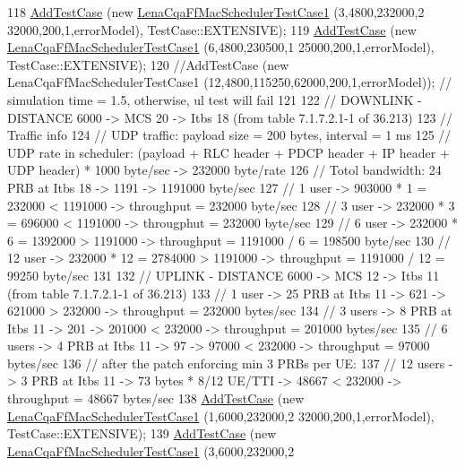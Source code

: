 \begin{DoxyCode}
118   \hyperlink{classns3_1_1TestCase_a3718088e3eefd5d6454569d2e0ddd835}{AddTestCase} (\textcolor{keyword}{new} \hyperlink{classLenaCqaFfMacSchedulerTestCase1}{LenaCqaFfMacSchedulerTestCase1} (3,4800,232000,2
      32000,200,1,errorModel), TestCase::EXTENSIVE);
119   \hyperlink{classns3_1_1TestCase_a3718088e3eefd5d6454569d2e0ddd835}{AddTestCase} (\textcolor{keyword}{new} \hyperlink{classLenaCqaFfMacSchedulerTestCase1}{LenaCqaFfMacSchedulerTestCase1} (6,4800,230500,1
      25000,200,1,errorModel), TestCase::EXTENSIVE);
120   \textcolor{comment}{//AddTestCase (new LenaCqaFfMacSchedulerTestCase1 (12,4800,115250,62000,200,1,errorModel)); // simulation
       time = 1.5, otherwise, ul test will fail}
121 
122   \textcolor{comment}{// DOWNLINK - DISTANCE 6000 -> MCS 20 -> Itbs 18 (from table 7.1.7.2.1-1 of 36.213)}
123   \textcolor{comment}{// Traffic info}
124   \textcolor{comment}{//   UDP traffic: payload size = 200 bytes, interval = 1 ms}
125   \textcolor{comment}{//   UDP rate in scheduler: (payload + RLC header + PDCP header + IP header + UDP header) * 1000 byte/sec
       -> 232000 byte/rate }
126   \textcolor{comment}{// Totol bandwidth: 24 PRB at Itbs 18 -> 1191 -> 1191000 byte/sec}
127   \textcolor{comment}{// 1 user -> 903000 * 1 = 232000 < 1191000 -> throughput = 232000 byte/sec}
128   \textcolor{comment}{// 3 user -> 232000 * 3 = 696000 < 1191000 -> througphut = 232000 byte/sec}
129   \textcolor{comment}{// 6 user -> 232000 * 6 = 1392000 > 1191000 -> throughput = 1191000 / 6 = 198500 byte/sec}
130   \textcolor{comment}{// 12 user -> 232000 * 12 = 2784000 > 1191000 -> throughput =  1191000 / 12 = 99250 byte/sec}
131 
132   \textcolor{comment}{// UPLINK - DISTANCE 6000 -> MCS 12 -> Itbs 11 (from table 7.1.7.2.1-1 of 36.213)}
133   \textcolor{comment}{// 1 user -> 25 PRB at Itbs 11 -> 621 -> 621000 > 232000 -> throughput = 232000 bytes/sec}
134   \textcolor{comment}{// 3 users -> 8 PRB at Itbs 11 -> 201 -> 201000 < 232000 -> throughput = 201000  bytes/sec}
135   \textcolor{comment}{// 6 users -> 4 PRB at Itbs 11 -> 97 -> 97000 < 232000 -> throughput = 97000 bytes/sec}
136   \textcolor{comment}{// after the patch enforcing min 3 PRBs per UE:}
137   \textcolor{comment}{// 12 users -> 3 PRB at Itbs 11 -> 73 bytes * 8/12 UE/TTI -> 48667 < 232000 -> throughput = 48667
       bytes/sec}
138   \hyperlink{classns3_1_1TestCase_a3718088e3eefd5d6454569d2e0ddd835}{AddTestCase} (\textcolor{keyword}{new} \hyperlink{classLenaCqaFfMacSchedulerTestCase1}{LenaCqaFfMacSchedulerTestCase1} (1,6000,232000,2
      32000,200,1,errorModel), TestCase::EXTENSIVE);
139   \hyperlink{classns3_1_1TestCase_a3718088e3eefd5d6454569d2e0ddd835}{AddTestCase} (\textcolor{keyword}{new} \hyperlink{classLenaCqaFfMacSchedulerTestCase1}{LenaCqaFfMacSchedulerTestCase1} (3,6000,232000,2

\end{DoxyCode}
